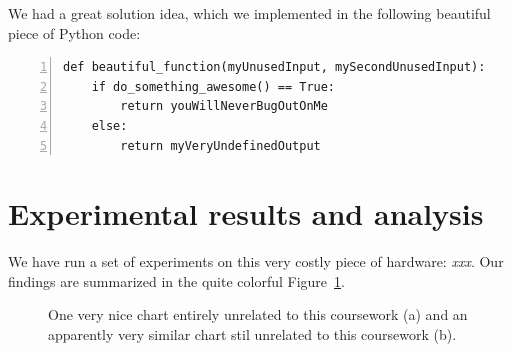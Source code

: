 \documentclass[a4paper]{article}
\numberwithin{equation}{section} %
\begin{document}
We had a great solution idea, which we implemented in the following beautiful piece of Python code:


\begin{Verbatim}[numbers=left]
def beautiful_function(myUnusedInput, mySecondUnusedInput):
    if do_something_awesome() == True:
        return youWillNeverBugOutOnMe
    else:
        return myVeryUndefinedOutput
\end{Verbatim}


\section{Experimental results and analysis}

We have run a set of experiments on this very costly piece of hardware: {\em xxx}. Our findings are summarized in the quite colorful Figure~\ref{fig:whatANiceFigure}.


\begin{figure}[h]
  \caption{One very nice chart entirely unrelated to this coursework (a) and an apparently very similar chart stil unrelated to this coursework (b).}
  \label{fig:whatANiceFigure}
\end{figure}
\end{document}
